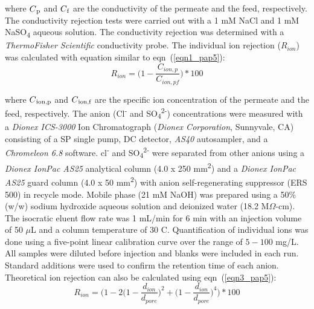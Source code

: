 where $C\textsubscript{p}$ and $C\textsubscript{f}$ are the conductivity of the permeate and the feed, respectively. The conductivity rejection tests were carried out with a 1 mM NaCl and 1 mM NaSO\textsubscript{4} aqueous solution. The conductivity rejection was determined with a \textit{ThermoFisher Scientific} conductivity probe. 
The individual ion rejection ($R_{ion}$) was calculated with equation similar to eqn~(\ref{eqn1_pap5}): 
\begin{equation}
  R_{ion} ={\Big(1- \dfrac{C_{ion,p}}{C_{ion,pf}}\Big)*100}
 \label{eqn2_pap5}
\end{equation}

where $C\textsubscript{ion,p}$ and $C\textsubscript{ion,f}$ are the specific ion concentration of the permeate and the feed, respectively. The anion (Cl\textsuperscript{-} and SO\textsubscript{4}\textsuperscript{2-}) concentrations were measured with a \textit{Dionex ICS-3000} Ion Chromatograph (\textit{Dionex Corporation}, Sunnyvale, CA) consisting of a SP single pump, DC detector, \textit{AS40} autosampler, and a \textit{Chromeleon 6.8} software. cl\textsuperscript{-} and SO\textsubscript{4}\textsuperscript{2-} were separated from other anions using a \textit{Dionex IonPac AS25} analytical column (4.0 x 250 mm\textsuperscript{2}) and a \textit{Dionex IonPac AS25} guard column (4.0 x 50 mm\textsuperscript{2}) with anion self-regenerating suppressor (ERS 500) in recycle mode. Mobile phase (21 mM NaOH) was prepared using a 50\% (w/w) sodium hydroxide aqueous solution and deionized water (18.2 M$\Omega$-cm). The isocratic eluent flow rate was 1 mL/min for 6 min with an injection volume of 50 $\mu$L and a column temperature of 30 \textdegree C. Quantification of individual ions was done using a five-point linear calibration curve over the range of $5-100$ mg/L. All samples were diluted before injection and blanks were included in each run. Standard additions were used to confirm the retention time of each anion.
Theoretical ion rejection can also be calculated using eqn~(\ref{eqn3_pap5}):\cite{Davisbook}
\begin{equation}
  R_{ion} ={\Big(1- 2\Big(1-\dfrac{d_{ion}}{d_{pore}}\Big)^2+\Big(1-\dfrac{d_{ion}}{d_{pore}}\Big)^4 \Big)*100}
 \label{eqn3_pap5}
\end{equation}


